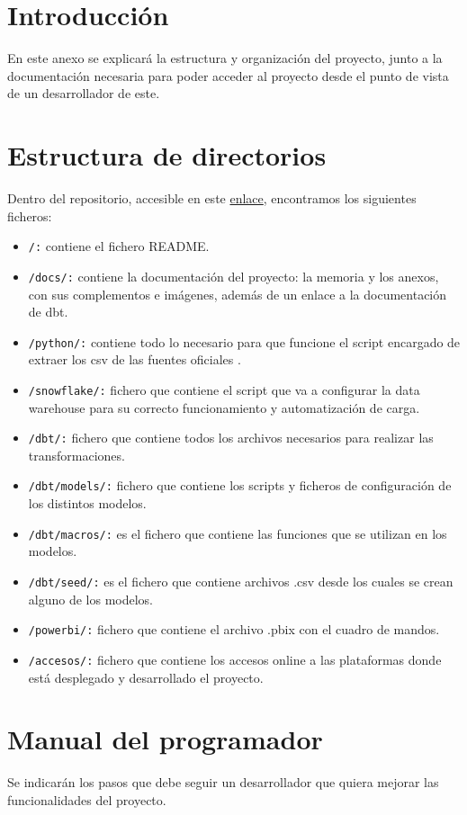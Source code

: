 
\section{Introducción}
En este anexo se explicará la estructura y organización del proyecto, junto a la documentación necesaria para poder acceder al proyecto desde el punto de vista de un desarrollador de este.
\section{Estructura de directorios}
Dentro del repositorio, accesible en este \href{https://github.com/JoseDanielBallester/Modern-Data-Stack-para-analizar-la-situaci-n-epidemeologica-}{enlace}, encontramos los siguientes ficheros:
\begin{itemize}
    \item \texttt{/:} contiene el fichero README.
    \item \texttt{/docs/:} contiene la documentación del proyecto: la memoria y los anexos, con sus complementos e imágenes, además de un enlace a la documentación de dbt.
    \item \texttt{/python/:} contiene todo lo necesario para que funcione el script encargado de extraer los csv de las fuentes oficiales .
    \item \texttt{/snowflake/:} fichero que contiene el script que va a configurar la data warehouse para su correcto funcionamiento y automatización de carga.
    \item \texttt{/dbt/:}  fichero que contiene todos los archivos necesarios para realizar las transformaciones.
    \item \texttt{/dbt/models/:} fichero que contiene los scripts y ficheros de configuración de los distintos modelos.
    \item \texttt{/dbt/macros/:} es el fichero que contiene las funciones que se utilizan en los modelos.
    \item \texttt{/dbt/seed/:} es el fichero que contiene archivos .csv desde los cuales se crean alguno de los modelos.
    \item \texttt{/powerbi/:} fichero que contiene el archivo .pbix con el cuadro de mandos.    
    \item \texttt{/accesos/:} fichero que contiene los accesos online a las plataformas donde está desplegado y desarrollado el proyecto.
\end{itemize}
\section{Manual del programador}
Se indicarán los pasos que debe seguir un desarrollador que quiera mejorar las funcionalidades del proyecto.

